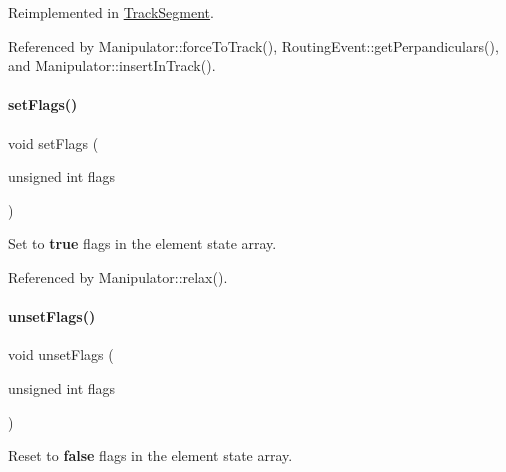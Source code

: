 Reimplemented in \hyperlink{classKite_1_1TrackSegment_aa0ba92ebf19f596537dc051c090d5736}{Track\+Segment}.



Referenced by Manipulator\+::force\+To\+Track(), Routing\+Event\+::get\+Perpandiculars(), and Manipulator\+::insert\+In\+Track().

\mbox{\label{classKite_1_1TrackElement_aeb14f94914af58657a0dc2f50ec98df5}} 
\paragraph{\texorpdfstring{set\+Flags()}{setFlags()}}
{\footnotesize\ttfamily void set\+Flags (\begin{DoxyParamCaption}\item[{unsigned int}]{flags }\end{DoxyParamCaption})\hspace{0.3cm}{\ttfamily [inline]}}

Set to {\bfseries true} {\ttfamily flags} in the element state array. 

Referenced by Manipulator\+::relax().

\mbox{\label{classKite_1_1TrackElement_a1a6fac115cb81db48e3ac9ffa0721bb5}} 
\paragraph{\texorpdfstring{unset\+Flags()}{unsetFlags()}}
{\footnotesize\ttfamily void unset\+Flags (\begin{DoxyParamCaption}\item[{unsigned int}]{flags }\end{DoxyParamCaption})\hspace{0.3cm}{\ttfamily [inline]}}

Reset to {\bfseries false} {\ttfamily flags} in the element state array. \mbox{\label{classKite_1_1TrackElement_abd3d8093f871d3d1a7f24b053648026c}} 
